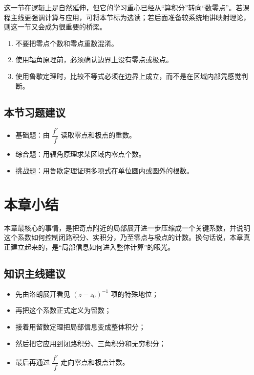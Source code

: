 \begin{tishi}[为什么这一节宜标为选读]
这一节在逻辑上是自然延伸，但它的学习重心已经从``算积分''转向``数零点''。若课程主线更强调计算与应用，可将本节标为选读；若后面准备较系统地讲映射理论，则这一节又会成为很重要的桥梁。
\end{tishi}

\begin{jinshi}[本节易错点]
\begin{enumerate}
    \item 不要把零点个数和零点重数混淆。
    \item 使用辐角原理前，必须确认边界上没有零点或极点。
    \item 使用鲁歇定理时，比较不等式必须在边界上成立，而不是在区域内部凭感觉判断。
\end{enumerate}
\end{jinshi}

\subsection*{本节习题建议}
\begin{itemize}
    \item 基础题：由 $\dfrac{f'}{f}$ 读取零点和极点的重数。
    \item 综合题：用辐角原理求某区域内零点个数。
    \item 挑战题：用鲁歇定理证明多项式在单位圆内或圆外的根数。
\end{itemize}

\section{本章小结}

\begin{wulibj}[一句话回看本章]
本章最核心的事情，是把奇点附近的局部展开进一步压缩成一个关键系数，并说明这个系数如何控制闭路积分、实积分，乃至零点与极点的计数。换句话说，本章真正建立起来的，是``局部信息如何进入整体计算''的眼光。
\end{wulibj}

\subsection*{知识主线建议}
\begin{itemize}
    \item 先由洛朗展开看见 $(z-z_0)^{-1}$ 项的特殊地位；
    \item 再把这个系数正式定义为留数；
    \item 接着用留数定理把局部信息变成整体积分；
    \item 然后把它应用到闭路积分、三角积分和无穷积分；
    \item 最后再通过 $\dfrac{f'}{f}$ 走向零点和极点计数。
\end{itemize}

